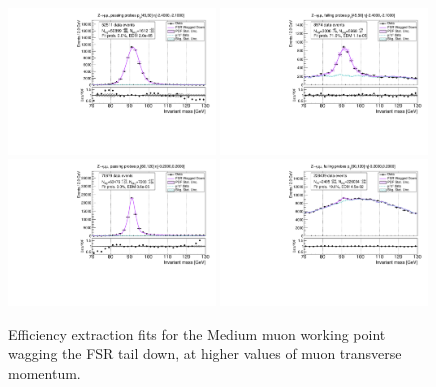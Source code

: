 \begin{figure}
\centering
\includegraphics[width=0.49\textwidth]{figures/Zmm_WagFsrDown_BkgLPi_pass_ptBin7_etaBin0.pdf}
\includegraphics[width=0.49\textwidth]{figures/Zmm_WagFsrDown_BkgLPi_fail_ptBin7_etaBin0.pdf}
\includegraphics[width=0.49\textwidth]{figures/Zmm_WagFsrDown_BkgLPi_pass_ptBin10_etaBin6.pdf}
\includegraphics[width=0.49\textwidth]{figures/Zmm_WagFsrDown_BkgLPi_fail_ptBin10_etaBin6.pdf}
\caption{Efficiency extraction fits for the Medium muon working point wagging the FSR tail down, at higher values of muon transverse momentum.}
\label{fig:ZmmAltSigFSRFits4}
\end{figure}

